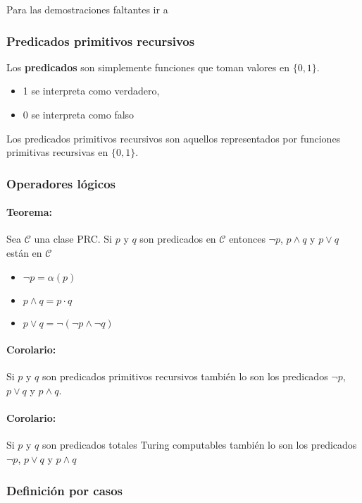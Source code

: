 Para las demostraciones faltantes ir a 
	\subsubsection{Predicados primitivos recursivos}
	Los \textbf{predicados} son simplemente funciones que toman valores en $\{0,1\}$.
	\begin{itemize}
	\item 1 se interpreta como verdadero,
	\item 0 se interpreta como falso
	\end{itemize}
	
	Los predicados primitivos recursivos son aquellos representados por funciones primitivas recursivas en $\{0,1\}$.
	

	\subsubsection{Operadores lógicos}
	
	\paragraph{Teorema:} Sea $\mathcal{C}$ una clase PRC. Si $p$ y $q$ son predicados en $\mathcal{C}$ entonces $\lnot p$, $p\land q$ y $p\lor q$ están en $\mathcal{C}$
	
	\begin{demo}
	\begin{itemize}
	\item $\lnot p = \alpha(p)$
	\item $p\land q = p \cdot q$
	\item $p \lor q = \lnot(\lnot p \land \lnot q)$ 
	\end{itemize}
	\end{demo}
	
	
	\paragraph{Corolario:} Si $p$ y $q$ son predicados primitivos recursivos también lo son los predicados $\lnot p$, $p\lor q$ y $p\land q$.
	
	\paragraph{Corolario:} Si $p$ y $q$ son predicados totales Turing computables también lo son los predicados $\lnot p$, $p\lor q$ y $p\land q$
	
	\subsubsection{Definición por casos}
